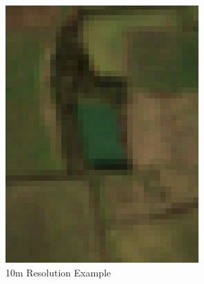 \begin{figure}[ht]
     \centering
     \begin{subfigure}[b]{0.45\textwidth}
         \centering
         \includegraphics[width=\textwidth]{contents/figures/LR 10m res.jpg}
         \caption{10m Resolution Example}
         \label{fig:10m resolution example}
     \end{subfigure}
     \hfill
     \begin{subfigure}[b]{0.45\textwidth}
         \centering

\end{subfigure}
\end{figure}
